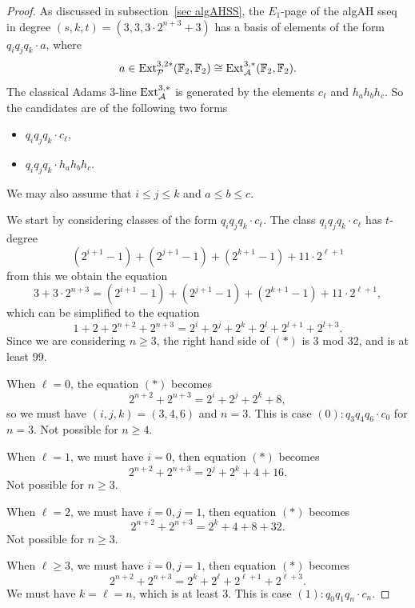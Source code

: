 \begin{proof}
  As discussed in subsection~\ref{sec algAHSS},
  the $E_1$-page of the algAH sseq in degree $(s,k,t) = (3,3,3 \cdot 2^{n+3}+3)$
  has a basis of elements of the form $q_iq_jq_k \cdot a$, where
  $$a \in \operatorname{\mathrm{Ext}}_{\mathcal{P}}^{3, 2*}(\operatorname{\mathbb{F}}_2, \operatorname{\mathbb{F}}_2) \cong \operatorname{\mathrm{Ext}}_{\operatorname{\mathcal{A}}}^{3, *}(\operatorname{\mathbb{F}}_2, \operatorname{\mathbb{F}}_2).$$ 
  The classical Adams $3$-line $\operatorname{\mathrm{Ext}}^{3,*}_{\operatorname{\mathcal{A}}}$ is generated by the elements $c_{\ell}$ and $h_ah_bh_c$. So the candidates are of the following two forms
  \begin{itemize}
  \item $q_iq_jq_k \cdot c_{\ell}$,
  \item $q_iq_jq_k \cdot h_ah_bh_c$.
  \end{itemize}
We may also assume that $i \leq j \leq k$ and $a \leq b \leq c$.


We start by considering classes of the form $q_iq_jq_k \cdot c_{\ell}$.
The class $q_iq_jq_k \cdot c_{\ell}$ has $t$-degree
$$ (2^{i+1} - 1) + (2^{j+1} - 1) + (2^{k+1} - 1) + 11 \cdot 2^{\ell+1} $$
from this we obtain the equation
$$3 + 3 \cdot 2^{n+3} = (2^{i+1} - 1) + (2^{j+1} - 1) + (2^{k+1} - 1) + 11 \cdot 2^{\ell+1},$$
which can be simplified to the equation
\begin{equation}
1 + 2 + 2^{n+2} + 2^{n+3} = 2^i + 2^j + 2^k + 2^l + 2^{l+1} + 2^{l+3}. \tag{$*$}
\end{equation}
Since we are considering $n \geq 3$, the right hand side of $(*)$ is 3 mod 32, and is at least 99.



When $\ell=0$, the equation $(*)$ becomes
$$2^{n+2} + 2^{n+3} = 2^i + 2^j + 2^k + 8,$$
so we must have $(i,j,k) = (3,4,6)$ and $n=3$. This is case $(0): q_3q_4q_6 \cdot c_0$ for $n=3$.
Not possible for $n \geq 4$.

When $\ell=1$, we must have $i=0$, then equation $(*)$ becomes
$$2^{n+2} + 2^{n+3} = 2^j + 2^k + 4 + 16.$$ 
Not possible for $n \geq 3$.

When $\ell=2$, we must have $i=0, j=1$, then equation $(*)$ becomes
$$2^{n+2} + 2^{n+3} = 2^k + 4 + 8 + 32.$$ 
Not possible for $n \geq 3$.

When $\ell \geq 3$, we must have $i=0, j=1$, then equation $(*)$ becomes
$$2^{n+2} + 2^{n+3} = 2^k + 2^{\ell} + 2^{\ell+1} + 2^{\ell+3}.$$ 
We must have $k=\ell=n$, which is at least 3. This is case $(1): q_0q_1q_n \cdot c_n$.



\end{proof}
